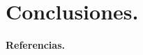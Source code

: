 \documentclass[12pt]{article}
\begin{document}
			
			
		 	
			
\newpage
\section*{Conclusiones.}

\newpage
\begin{center}
    \textbf{\Large Referencias.}
    \end{center}
\end{document}
